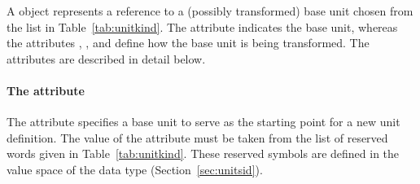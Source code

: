 \subsubsection{}
\label{sec:unit-structure}

A \Unit object represents a reference to a (possibly transformed)
base unit chosen from the list in Table~\vref{tab:unitkind}.  The
attribute  indicates the base unit, whereas the
attributes , , and 
define how the base unit is being transformed.  The attributes
are described in detail below.


\paragraph{The  attribute}

The \Unit attribute  specifies a base unit to serve as
the starting point for a new unit definition.  The value of the
attribute must be taken from the list of reserved words given in
Table~\vref{tab:unitkind}.  These reserved symbols are defined in
the value space of the data type 
(Section~\ref{sec:unitsid}).

